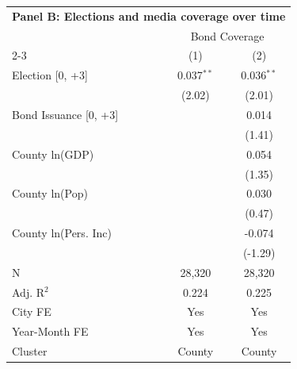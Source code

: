 \begingroup
\centering
\begin{tabular*}{\textwidth}{@{\extracolsep{\fill}}lcc}
\multicolumn{3}{l}{\textbf{Panel B: Elections and media coverage over time}}\\

\addlinespace
   \toprule
    & \multicolumn{2}{c}{Bond Coverage}\\
   \cmidrule(lr){2-3}
                         & (1)          & (2)\\  
   \midrule 
   Election [0, +3]      & 0.037$^{**}$ & 0.036$^{**}$\\   
                         & (2.02)      & (2.01)\\   
   Bond Issuance [0, +3] &              & 0.014\\   
                         &              & (1.41)\\   
   County ln(GDP)        &              & 0.054\\   
                         &              & (1.35)\\   
   County ln(Pop)        &              & 0.030\\   
                         &              & (0.47)\\   
   County ln(Pers. Inc)  &              & -0.074\\   
                         &              & (-1.29)\\   
   \hline
   N          & 28,320       & 28,320\\  
   Adj. R$^2$        & 0.224        & 0.225\\  
   City FE               & Yes          & Yes\\  
   Year-Month FE         & Yes          & Yes\\  
   Cluster              & County & County\\  
   \bottomrule
\end{tabular*}
\par\endgroup
